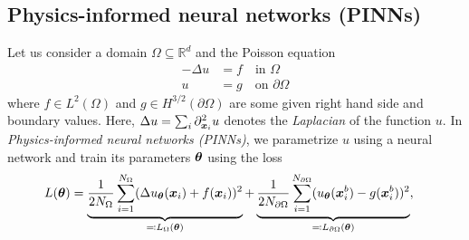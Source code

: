 \subsection{Physics-informed neural networks (PINNs)}
Let us consider a domain $\Omega\subseteq\mathbb R^d$ and the Poisson equation %
\begin{align*}\tag{PE}\label{eq:PE}
  -\Delta u & = f \quad \text{in }\Omega \\
  u & = g \quad \text{on }\partial\Omega
\end{align*}
where $f\in L^2(\Omega)$ and $g\in H^{3/2}(\partial\Omega)$ are some given right hand side and boundary values.
Here, $\Delta u = \sum_i \partial_{{\bm{x}}_i}^2 u$ denotes the \emph{Laplacian} of the function $u$.
In \emph{Physics-informed neural networks (PINNs)}, we parametrize $u$ using a neural network and train its parameters ${\bm{\theta}}$ using the loss
\begin{align}
  L({\bm{\theta}})
  &=
    \underbrace{\frac{1}{2N_\Omega} \sum_{i=1}^{N_\Omega} (\Delta u_{\bm{\theta}}({\bm{x}}_i) + f({\bm{x}}_i))^2}_{\eqqcolon L_\Omega({\bm{\theta}})} + \underbrace{\frac{1}{2N_{\partial\Omega}}\sum_{i=1}^{N_{\partial\Omega}} ( u_{\bm{\theta}}({\bm{x}}^b_i) - g({\bm{x}}^b_i))^2}_{\eqqcolon L_{\partial\Omega}({\bm{\theta}})},
\end{align}
